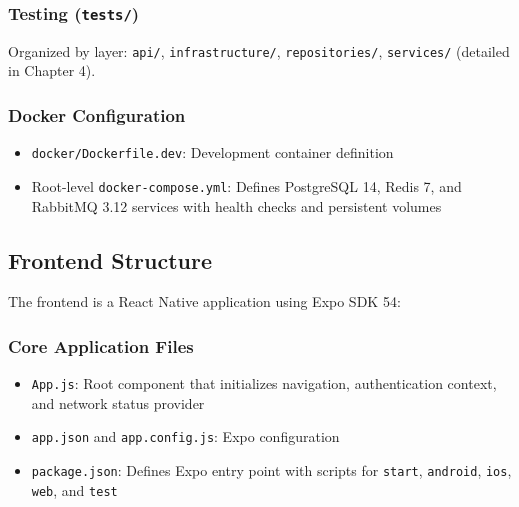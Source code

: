 \subsubsection{Testing (\texttt{tests/})}
Organized by layer: \texttt{api/}, \texttt{infrastructure/}, \texttt{repositories/}, \texttt{services/} (detailed in Chapter 4).

\subsubsection{Docker Configuration}
\begin{itemize}
    \item \texttt{docker/Dockerfile.dev}: Development container definition
    \item Root-level \texttt{docker-compose.yml}: Defines PostgreSQL 14, Redis 7, and RabbitMQ 3.12 services with health checks and persistent volumes
\end{itemize}

\subsection{Frontend Structure}
\label{subsec:frontend_structure}

The frontend is a React Native application using Expo SDK 54:

\subsubsection{Core Application Files}
\begin{itemize}
    \item \texttt{App.js}: Root component that initializes navigation, authentication context, and network status provider
    \item \texttt{app.json} and \texttt{app.config.js}: Expo configuration
    \item \texttt{package.json}: Defines Expo entry point with scripts for \texttt{start}, \texttt{android}, \texttt{ios}, \texttt{web}, and \texttt{test}
\end{itemize}

